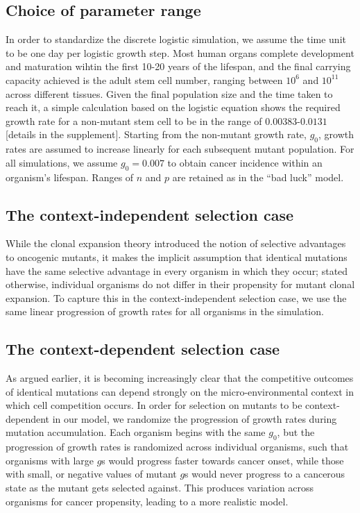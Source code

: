 \documentclass[9pt,twocolumn,twoside]{pnas-new}
\begin{document}
	\subsection*{Choice of parameter range}
	In order to standardize the discrete logistic simulation, we assume the time unit to be one day per logistic growth step. Most human organs complete development and maturation wihtin the first 10-20 years of the lifespan, and the final carrying capacity achieved is the adult stem cell number, ranging between $10^{6}$ and $10^{11}$ across different tissues. Given the final population size and the time taken to reach it, a simple calculation based on the logistic equation shows the required growth rate for a non-mutant stem cell to be in the range of $0.00383$-$0.0131$ [details in the supplement]. Starting from the non-mutant growth rate, $g_{0}$, growth rates are assumed to increase linearly for each subsequent mutant population. For all simulations, we assume $g_{0}=0.007$ to obtain cancer incidence within an organism's lifespan. Ranges of $n$ and $p$ are retained as in the ``bad luck'' model.

	\subsection*{The context-independent selection case}
	While the clonal expansion theory introduced the notion of selective advantages to oncogenic mutants, it makes the implicit assumption that identical mutations have the same selective advantage in every organism in which they occur; stated otherwise, individual organisms do not differ in their propensity for mutant clonal expansion. To capture this in the context-independent selection case, we use the same linear progression of growth rates for all organisms in the simulation.

	\subsection*{The context-dependent selection case}
	As argued earlier, it is becoming increasingly clear that the competitive outcomes of identical mutations can depend strongly on the micro-environmental context in which cell competition occurs. In order for selection on mutants to be context-dependent in our model, we randomize the progression of growth rates during mutation accumulation. Each organism begins with the same $g_{0}$, but the progression of growth rates is randomized across individual organisms, such that organisms with large $g$s would progress faster towards cancer onset, while those with small, or negative values of mutant $g$s would never progress to a cancerous state as the mutant gets selected against. This produces variation across organisms for cancer propensity, leading to a more realistic model.
\end{document}
